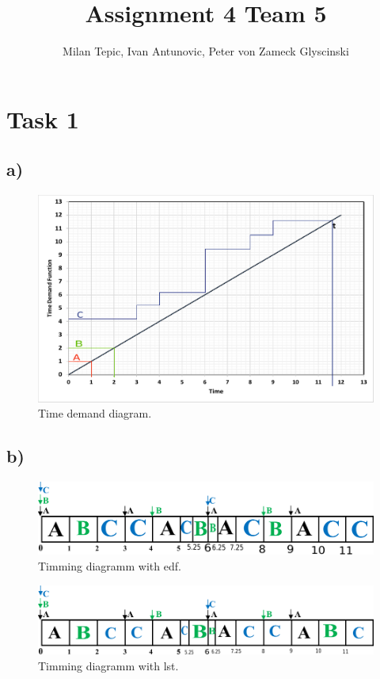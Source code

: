 \documentclass[10pt,a4paper]{article}
\author{Milan Tepic, Ivan Antunovic, Peter von Zameck Glyscinski}
\title{Assignment 4 Team 5}
\begin{document}
\maketitle
\section*{Task 1}
\subsection*{a)}
\begin{figure}[h]
\includegraphics[width=\linewidth]{time-demand-1a.pdf}
\caption{Time demand diagram.} 
\label{fig:1a}
\end{figure}

\subsection*{b)}

\begin{figure}[h]
\includegraphics[width=\linewidth]{1b-edf.pdf}
\caption{Timming diagramm with edf.} 
\label{fig:1bedf}
\end{figure}

\begin{figure}[h]
\includegraphics[width=\linewidth]{1b-lst.pdf}
\caption{Timming diagramm with lst.} 
\label{fig:1blst}
\end{figure}
\end{document}
